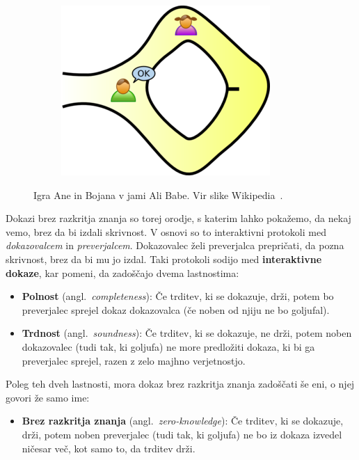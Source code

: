 \documentclass[isrm2, tisk]{fmfdelo}
\begin{document}
\begin{primer}
\begin{figure}[h!]
\begin{subfigure}{0.25\textwidth}
        \end{subfigure}
        \hspace{0.25cm}
        \begin{subfigure}{0.25\textwidth}
            \includegraphics[width=\textwidth]{images/zkp3.png}
        \end{subfigure}
        \caption[Jama Ali Babe.]{Igra Ane in Bojana v jami Ali Babe. Vir slike Wikipedia~\cite{zkp}.}
        \label{fig:alibaba}
    \end{figure}
\end{primer}

Dokazi brez razkritja znanja so torej orodje, s katerim lahko pokažemo, da nekaj vemo, brez da bi 
izdali skrivnost. V osnovi so to interaktivni protokoli med \textit{dokazovalcem} in \textit{preverjalcem}. 
Dokazovalec želi preverjalca prepričati, da pozna skrivnost, brez da bi mu jo izdal. Taki protokoli 
sodijo med \textbf{interaktivne dokaze}, kar pomeni, da zadoščajo dvema lastnostima:
\begin{itemize}
    \item \textbf{Polnost} (angl.\ \textit{completeness}): Če trditev, ki se dokazuje,
        drži, potem bo preverjalec sprejel dokaz dokazovalca (če noben od njiju ne bo goljufal).
    \item \textbf{Trdnost} (angl.\ \textit{soundness}): Če trditev, ki se dokazuje, ne
        drži, potem noben dokazovalec (tudi tak, ki goljufa) ne more predložiti dokaza, ki bi 
        ga preverjalec sprejel, razen z zelo majhno verjetnostjo.
\end{itemize}
Poleg teh dveh lastnosti, mora dokaz brez razkritja znanja zadoščati še eni, o njej govori že samo ime:
\begin{itemize}
    \item \textbf{Brez razkritja znanja} (angl.\ \textit{zero-knowledge}): Če trditev, ki se dokazuje, 
        drži, potem noben preverjalec (tudi tak, ki goljufa) ne bo iz dokaza izvedel ničesar več, 
        kot samo to, da trditev drži.
\end{itemize}
\end{document}
